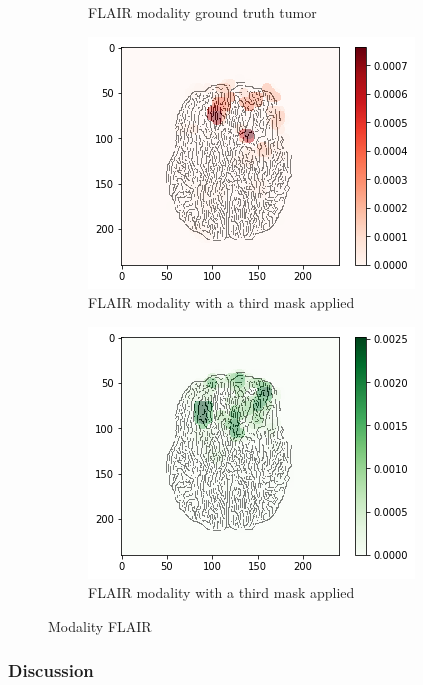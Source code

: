 \begin{figure}[H]
\begin{subfigure}[t]{.4\textwidth}
        \caption{FLAIR modality ground truth tumor}
    \end{subfigure}
    \begin{subfigure}[t]{.45\textwidth}
        \centering
        \includegraphics[width=\linewidth]{chapters/06_hdm/c_Brats18_2013_17_1_L1/58.png}
        \caption{FLAIR modality with a third mask applied}
    \end{subfigure}\hspace{1cm}%
    \begin{subfigure}[t]{.45\textwidth}
        \centering
        \includegraphics[width=\linewidth]{chapters/06_hdm/c_Brats18_2013_17_1_L1/59.png}
        \caption{FLAIR modality with a third mask applied}
    \end{subfigure}
    \caption{Modality FLAIR}
\end{figure}

\subsubsection{Discussion}
